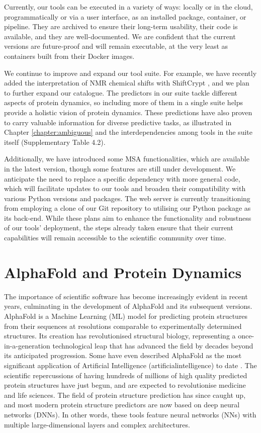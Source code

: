Currently, our tools can be executed in a variety of ways: locally or in the cloud, programmatically or via a user interface, as an installed package, container, or pipeline. They are archived to ensure their long-term usability, their code is available, and they are well-documented. We are confident that the current versions are future-proof and will remain executable, at the very least as containers built from their Docker images.

We continue to improve and expand our tool suite. For example, we have recently added the interpretation of NMR chemical shifts with ShiftCrypt \cite{orlando_shiftcrypt_2020}, and we plan to further expand our catalogue. The predictors in our suite tackle different aspects of protein \gls{dynamics}, so including more of them in a single suite helps provide a holistic vision of protein \gls{dynamics}. These predictions have also proven to carry valuable information for diverse predictive tasks, as illustrated in Chapter \ref{chapter:ambiguous} \cite{roca-martinez_challenges_2022} and the interdependencies among tools in the suite itself (Supplementary Table 4.2). 

Additionally, we have introduced some MSA functionalities, which are available in the latest version, though some features are still under development. We anticipate the need to replace a specific dependency with more general code, which will facilitate updates to our tools and broaden their compatibility with various Python versions and packages. The web server is currently transitioning from employing a clone of our Git repository to utilising our Python package as its back-end. While these plans aim to enhance the functionality and robustness of our tools' deployment, the steps already taken ensure that their current capabilities will remain accessible to the scientific community over time.

\section{AlphaFold and Protein Dynamics}

The importance of scientific software has become increasingly evident in recent years, culminating in the development of AlphaFold and its subsequent versions. AlphaFold is a Machine Learning (ML) model for predicting protein structures from their sequences at resolutions comparable to experimentally determined structures. Its creation has revolutionised structural biology, representing a once-in-a-generation technological leap that has advanced the field by decades beyond its anticipated progression. Some have even described AlphaFold as the most significant application of Artificial Intelligence (\gls{artificialintelligence}) to date \cite{toews_alphafold_nodate}. The scientific repercussions of having hundreds of millions of high quality predicted protein structures have just begun, and are expected to revolutionise medicine and life sciences. The field of protein structure prediction has since caught up, and most modern protein structure predictors are now based on deep neural networks (DNNs). In other words, these tools feature neural networks (NNs) with multiple large-dimensional layers and complex architectures.


